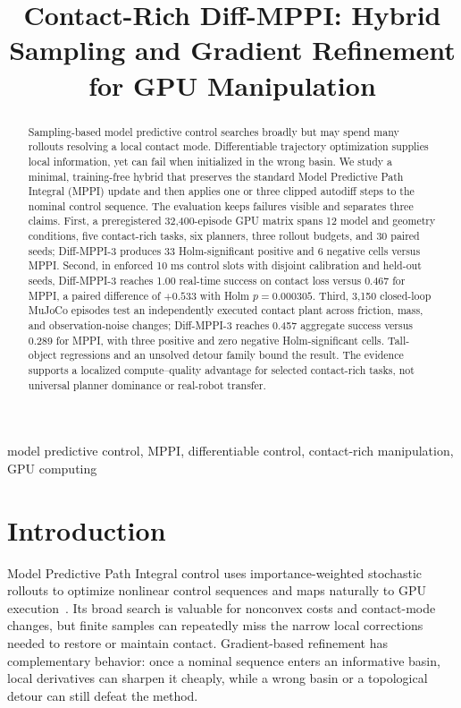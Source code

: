 \documentclass[conference]{IEEEtran}
\begin{document}
\title{Contact-Rich Diff-MPPI: Hybrid Sampling and Gradient Refinement
for GPU Manipulation}

\author{}

\maketitle

\begin{abstract}
Sampling-based model predictive control searches broadly but may spend many
rollouts resolving a local contact mode.  Differentiable trajectory
optimization supplies local information, yet can fail when initialized in the
wrong basin.  We study a minimal, training-free hybrid that preserves the
standard Model Predictive Path Integral (MPPI) update and then applies one or
three clipped autodiff steps to the nominal control sequence.  The evaluation
keeps failures visible and separates three claims.  First, a preregistered
32,400-episode GPU matrix spans 12 model and geometry conditions, five
contact-rich tasks, six planners, three rollout budgets, and 30 paired seeds;
Diff-MPPI-3 produces 33 Holm-significant positive and 6 negative cells versus
MPPI.  Second, in enforced 10 ms control slots with disjoint calibration and
held-out seeds, Diff-MPPI-3 reaches 1.00 real-time success on contact loss
versus 0.467 for MPPI, a paired difference of \(+0.533\) with Holm
\(p=0.000305\).  Third, 3,150 closed-loop MuJoCo episodes test an independently
executed contact plant across friction, mass, and observation-noise changes;
Diff-MPPI-3 reaches 0.457 aggregate success versus 0.289 for MPPI, with three
positive and zero negative Holm-significant cells.  Tall-object regressions
and an unsolved detour family bound the result.  The evidence supports a
localized compute--quality advantage for selected contact-rich tasks, not
universal planner dominance or real-robot transfer.
\end{abstract}

\begin{IEEEkeywords}
model predictive control, MPPI, differentiable control, contact-rich
manipulation, GPU computing
\end{IEEEkeywords}

\section{Introduction}

Model Predictive Path Integral control uses importance-weighted stochastic
rollouts to optimize nonlinear control sequences and maps naturally to GPU
execution~\cite{williams2017mppi}.  Its broad search is valuable for
nonconvex costs and contact-mode changes, but finite samples can repeatedly
miss the narrow local corrections needed to restore or maintain contact.
Gradient-based refinement has complementary behavior: once a nominal sequence
enters an informative basin, local derivatives can sharpen it cheaply, while
a wrong basin or a topological detour can still defeat the method.
\end{document}
